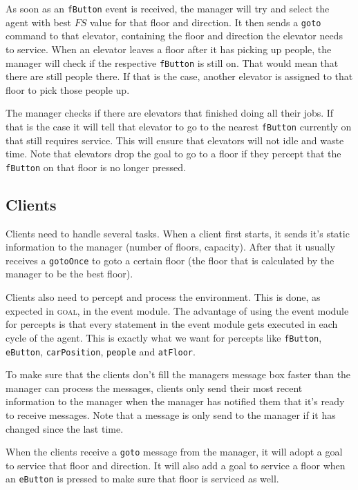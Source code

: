 \documentclass[a4paper,11pt,twocolumn]{article}
\begin{document}
As soon as an \texttt{fButton} event is received, the manager will try and select the agent with best $FS$ value for that floor and direction. It then sends a \texttt{goto} command to that elevator, containing the floor and direction the elevator needs to service. When an elevator leaves a floor after it has picking up people, the manager will check if the respective \texttt{fButton} is still on. That would mean that there are still people there. If that is the case, another elevator is assigned to that floor to pick those people up.

The manager checks if there are elevators that finished doing all their jobs. If that is the case it will tell that elevator to go to the nearest \texttt{fButton} currently on that still requires service. This will ensure that elevators will not idle and waste time. Note that elevators drop the goal to go to a floor if they percept that the \texttt{fButton} on that floor is no longer pressed.

\subsection{Clients}
Clients need to handle several tasks. When a client first starts, it sends it's static information to the manager (number of floors, capacity). After that it usually receives a \texttt{gotoOnce} to goto a certain floor (the floor that is calculated by the manager to be the best floor).

Clients also need to percept and process the environment. This is done, as expected in \textsc{goal}, in the event module. The advantage of using the event module for percepts is that every statement in the event module gets executed in each cycle of the agent. This is exactly what we want for percepts like \texttt{fButton}, \texttt{eButton}, \texttt{carPosition}, \texttt{people} and \texttt{atFloor}. 

To make sure that the clients don't fill the managers message box faster than the manager can process the messages, clients only send their most recent information to the manager when the manager has notified them that it's ready to receive messages. Note that a message is only send to the manager if it has changed since the last time.

When the clients receive a \texttt{goto} message from the manager, it will adopt a goal to service that floor and direction. It will also add a goal to service a floor when an \texttt{eButton} is pressed to make sure that floor is serviced as well.
\end{document}
